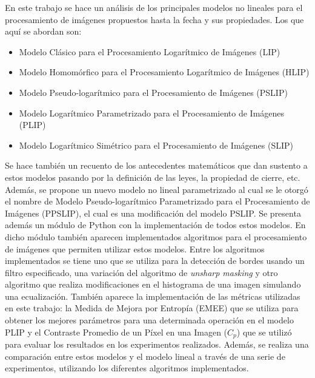 \begin{resumen}
	En este trabajo se hace un an\'alisis de los principales modelos no lineales para el procesamiento de im\'agenes propuestos hasta la fecha y sus propiedades. Los que aqu\'i se abordan son:
	
	\begin{itemize}
		\item Modelo Cl\'asico para el Procesamiento Logar\'itmico de Im\'agenes (LIP)
		\item Modelo Homom\'orfico para el Procesamiento Logar\'itmico de Im\'agenes (HLIP)
		\item  Modelo Pseudo-logar\'itmico para el Procesamiento de Im\'agenes (PSLIP)
		\item Modelo Logar\'itmico Parametrizado para el Procesamiento de Im\'agenes (PLIP)
		\item Modelo  Logar\'itmico Sim\'etrico para el Procesamiento de Im\'agenes (SLIP)
	\end{itemize}
	
	Se hace tambi\'en un recuento de los antecedentes matem\'aticos que dan sustento a estos modelos pasando por la definici\'on de las leyes, la propiedad de cierre, etc. Adem\'as, se propone un nuevo modelo no lineal parametrizado al cual se le otorg\'o el nombre de Modelo Pseudo-logar\'itmico Parametrizado para el Procesamiento de Im\'agenes (PPSLIP), el cual es una modificaci\'on del modelo PSLIP. Se presenta adem\'as un m\'odulo de Python con la implementaci\'on de todos estos modelos. En dicho m\'odulo tambi\'en aparecen implementados algoritmos para el procesamiento de im\'agenes que permiten utilizar estos modelos. Entre los algoritmos implementados se tiene uno que se utiliza para la detecci\'on de bordes usando un filtro especificado, una variaci\'on del algoritmo de \textit{unsharp masking} y otro algoritmo que realiza modificaciones en el histograma de una imagen simulando una ecualizaci\'on. Tambi\'en aparece la implementaci\'on de las m\'etricas utilizadas en este trabajo: la Medida de Mejora por Entropía (EMEE) que se utiliza para obtener los mejores par\'ametros para una determinada operaci\'on en el modelo PLIP y el Contraste Promedio de un P\'ixel en una Imagen ($C_p$) que se utiliz\'o para evaluar los resultados en los experimentos realizados. Adem\'as, se realiza una comparaci\'on entre estos modelos y el modelo lineal a trav\'es de una serie de experimentos, utilizando los diferentes algoritmos implementados.
\end{resumen}

